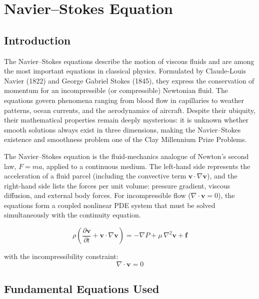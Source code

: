 \chapter{Navier--Stokes Equation}

\section*{Introduction}

The Navier--Stokes equations describe the motion of viscous fluids and are among the most important equations in classical physics. Formulated by Claude-Louis Navier (1822) and George Gabriel Stokes (1845), they express the conservation of momentum for an incompressible (or compressible) Newtonian fluid. The equations govern phenomena ranging from blood flow in capillaries to weather patterns, ocean currents, and the aerodynamics of aircraft. Despite their ubiquity, their mathematical properties remain deeply mysterious: it is unknown whether smooth solutions always exist in three dimensions, making the Navier--Stokes existence and smoothness problem one of the Clay Millennium Prize Problems.

The Navier--Stokes equation is the fluid-mechanics analogue of Newton's second law, $F = ma$, applied to a continuous medium. The left-hand side represents the acceleration of a fluid parcel (including the convective term $\mathbf{v}\cdot\nabla\mathbf{v}$), and the right-hand side lists the forces per unit volume: pressure gradient, viscous diffusion, and external body forces. For incompressible flow ($\nabla\cdot\mathbf{v} = 0$), the equations form a coupled nonlinear PDE system that must be solved simultaneously with the continuity equation.


\begin{equation}
\boxed{\;\rho\left(\frac{\partial \mathbf{v}}{\partial t} + \mathbf{v}\cdot\nabla\mathbf{v}\right) = -\nabla P + \mu\,\nabla^{2}\mathbf{v} + \mathbf{f}\;}
\label{eq:navier-stokes}
\end{equation}

with the incompressibility constraint:
\begin{equation}
\nabla\cdot\mathbf{v} = 0
\label{eq:continuity}
\end{equation}

\section*{Fundamental Equations Used}

